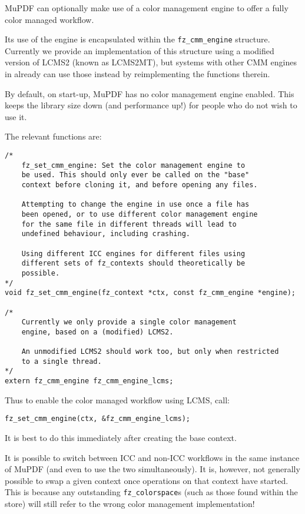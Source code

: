 \documentclass[oneside]{book}
\begin{document}
MuPDF can optionally make use of a color management engine to offer a fully color managed workflow.

Its use of the engine is encapsulated within the \texttt{fz\_cmm\_engine} structure. Currently we provide an implementation of this structure using a modified version of LCMS2 (known as LCMS2MT), but systems with other CMM engines in already can use those instead by reimplementing the functions therein.

By default, on start-up, MuPDF has no color management engine enabled. This keeps the library size down (and performance up!) for people who do not wish to use it.

The relevant functions are:

\begin{lstlisting}
/*
	fz_set_cmm_engine: Set the color management engine to
	be used. This should only ever be called on the "base"
	context before cloning it, and before opening any files.

	Attempting to change the engine in use once a file has
	been opened, or to use different color management engine
	for the same file in different threads will lead to
	undefined behaviour, including crashing.

	Using different ICC engines for different files using
	different sets of fz_contexts should theoretically be
	possible.
*/
void fz_set_cmm_engine(fz_context *ctx, const fz_cmm_engine *engine);

/*
	Currently we only provide a single color management
	engine, based on a (modified) LCMS2.

	An unmodified LCMS2 should work too, but only when restricted
	to a single thread.
*/
extern fz_cmm_engine fz_cmm_engine_lcms;
\end{lstlisting}

Thus to enable the color managed workflow using LCMS, call:

\begin{lstlisting}
fz_set_cmm_engine(ctx, &fz_cmm_engine_lcms); 
\end{lstlisting}

It is best to do this immediately after creating the base context.

It is possible to switch between ICC and non-ICC workflows in the same instance of MuPDF (and even to use the two simultaneously). It is, however, not generally possible to swap a given context once operations on that context have started. This is because any outstanding \texttt{fz\_colorspace}s (such as those found within the store) will still refer to the wrong color management implementation!
\end{document}
